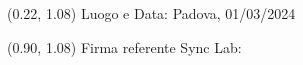 \documentclass{article}
\begin{document}
\begin{textblock*}{\textwidth}(0.22\textwidth, 1.08\textheight)
    Luogo e Data: Padova, 01/03/2024
\end{textblock*}

\begin{textblock*}{\textwidth}(0.90\textwidth, 1.08\textheight)
        Firma referente Sync Lab:
\end{textblock*}
\end{document}
